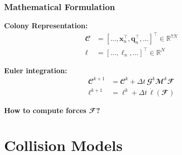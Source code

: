\documentclass[10pt,t]{beamer}
\begin{document}
\begin{frame}
    \frametitle{Mathematical Formulation}

    \textbf{Colony Representation:}
    \begin{equation*}
        \begin{align}
            \mathbfcal{C}     & = [\dots, \mathbf{x}_n^\top, \mathbf{q}_n^\top, \dots]^\top \in \mathbb{R}^{7N} \\
            \boldsymbol{\ell} & = [\dots, \ell_n, \dots]^\top \in \mathbb{R}^{N}
        \end{align}
    \end{equation*}

    \vspace{0.8cm}

    \textbf{Euler integration:}
    \begin{equation*}
        \begin{aligned}
            \mathbfcal{C}^{k+1}     & = \mathbfcal{C}^k + \Delta t \, \mathbfcal{G}^k \mathbfcal{M}^k \mathbfcal{F} \\
            \boldsymbol{\ell}^{k+1} & = \boldsymbol{\ell}^k + \Delta t \, \dot{\boldsymbol{\ell}}(\mathbfcal{F})
        \end{aligned}
    \end{equation*}

    \vspace{0.1cm}

    \begin{center}
        \colorbox{yellow!30}{
            \textbf{How to compute forces $\mathbfcal{F}$?}
        }
    \end{center}

\end{frame}


\section{Collision Models}
\end{document}
